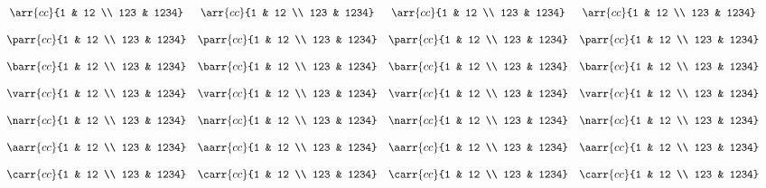 \documentclass{standalone}
\begin{document}
\(\begin{array}{ccccc}
\\\\%
&	\arr{cc}{1 & 12 \\ 123 & 1234}
&	\arr{cc}{1 & 12 \\ 123 & 1234}
&	\arr{cc}{1 & 12 \\ 123 & 1234}
&	\arr{cc}{1 & 12 \\ 123 & 1234}
\\\\%
&	\parr{cc}{1 & 12 \\ 123 & 1234}
&	\parr{cc}{1 & 12 \\ 123 & 1234}
&	\parr{cc}{1 & 12 \\ 123 & 1234}
&	\parr{cc}{1 & 12 \\ 123 & 1234}
\\\\%
&	\barr{cc}{1 & 12 \\ 123 & 1234}
&	\barr{cc}{1 & 12 \\ 123 & 1234}
&	\barr{cc}{1 & 12 \\ 123 & 1234}
&	\barr{cc}{1 & 12 \\ 123 & 1234}
\\\\%
&	\varr{cc}{1 & 12 \\ 123 & 1234}
&	\varr{cc}{1 & 12 \\ 123 & 1234}
&	\varr{cc}{1 & 12 \\ 123 & 1234}
&	\varr{cc}{1 & 12 \\ 123 & 1234}
\\\\%
&	\narr{cc}{1 & 12 \\ 123 & 1234}
&	\narr{cc}{1 & 12 \\ 123 & 1234}
&	\narr{cc}{1 & 12 \\ 123 & 1234}
&	\narr{cc}{1 & 12 \\ 123 & 1234}
\\\\%
&	\aarr{cc}{1 & 12 \\ 123 & 1234}
&	\aarr{cc}{1 & 12 \\ 123 & 1234}
&	\aarr{cc}{1 & 12 \\ 123 & 1234}
&	\aarr{cc}{1 & 12 \\ 123 & 1234}
\\\\%
&	\carr{cc}{1 & 12 \\ 123 & 1234}
&	\carr{cc}{1 & 12 \\ 123 & 1234}
&	\carr{cc}{1 & 12 \\ 123 & 1234}
&	\carr{cc}{1 & 12 \\ 123 & 1234}
\\\\%
\end{array}\)
\end{document}
